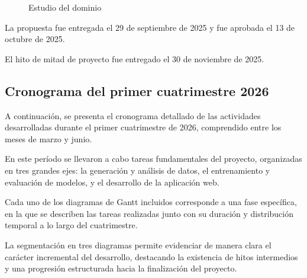 \documentclass[12pt,a4paper]{article}
\begin{document}
\begin{figure}[htbp]


\caption{Estudio del dominio}
\end{figure}

La propuesta fue entregada el 29 de septiembre de 2025 y fue aprobada el
13 de octubre de 2025.

El hito de mitad de proyecto fue entregado el 30 de noviembre de 2025.

\newpage
\subsection{Cronograma del primer cuatrimestre 2026}

A continuación, se presenta el cronograma detallado de las actividades desarrolladas durante el primer 
cuatrimestre de 2026, comprendido entre los meses de marzo y junio.

En este período se llevaron a cabo tareas fundamentales del proyecto, organizadas en tres grandes ejes: la 
generación y análisis de datos, el entrenamiento y evaluación de modelos, y el desarrollo de la aplicación web.

Cada uno de los diagramas de Gantt incluidos corresponde a una fase específica, en la que se describen las 
tareas realizadas junto con su duración y distribución temporal a lo largo del cuatrimestre.

La segmentación en tres diagramas permite evidenciar de manera clara el carácter incremental del desarrollo, 
destacando la existencia de hitos intermedios y una progresión estructurada hacia la finalización del proyecto.
\end{document}
